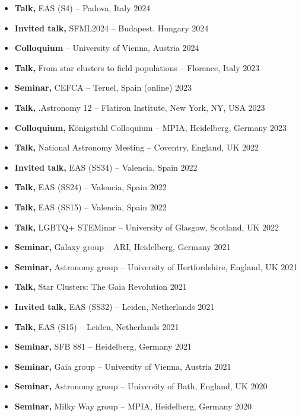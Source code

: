 \begin{itemize}
    \item \textbf{Talk,} EAS (S4) -- Padova, Italy \hfill 2024
    \item \textbf{Invited talk,} SFML2024 -- Budapest, Hungary \hfill 2024
    \item \textbf{Colloquium}  -- University of Vienna, Austria \hfill 2024
    \item \textbf{Talk,} From star clusters to field populations -- Florence, Italy \hfill 2023
    \item \textbf{Seminar,} CEFCA -- Teruel, Spain (online) \hfill 2023
    \item \textbf{Talk,} .Astronomy 12 -- Flatiron Institute, New York, NY, USA \hfill 2023
    \item \textbf{Colloquium,} Königstuhl Colloquium -- MPIA, Heidelberg, Germany \hfill 2023
    \item \textbf{Talk,} National Astronomy Meeting -- Coventry, England, UK \hfill 2022
    \item \textbf{Invited talk,} EAS (SS34) -- Valencia, Spain \hfill 2022
    \item \textbf{Talk,} EAS (SS24) -- Valencia, Spain \hfill 2022
    \item \textbf{Talk,} EAS (SS15) -- Valencia, Spain \hfill 2022
    \item \textbf{Talk,} LGBTQ+ STEMinar  -- University of Glasgow, Scotland, UK \hfill 2022
    \item \textbf{Seminar,} Galaxy group -- ARI, Heidelberg, Germany \hfill 2021
    \item \textbf{Seminar,} Astronomy group -- University of Hertfordshire, England, UK \hfill 2021
    \item \textbf{Talk,} Star Clusters: The Gaia Revolution \hfill 2021
    \item \textbf{Invited talk,} EAS (SS32) -- Leiden, Netherlands \hfill 2021
    \item \textbf{Talk,} EAS (S15) -- Leiden, Netherlands \hfill 2021
    \item \textbf{Seminar,} SFB 881 -- Heidelberg, Germany \hfill 2021
    \item \textbf{Seminar,} Gaia group -- University of Vienna, Austria \hfill 2021
    \item \textbf{Seminar,} Astronomy group -- University of Bath, England, UK \hfill 2020
    \item \textbf{Seminar,} Milky Way group -- MPIA, Heidelberg, Germany \hfill 2020
\end{itemize}